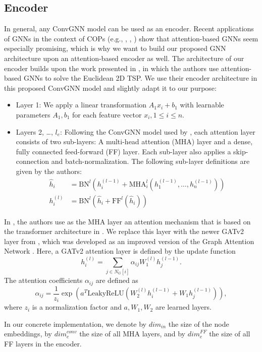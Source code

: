\documentclass[draft,final]{vutinfth} %
\begin{document}
\subsection{Encoder}
In general, any ConvGNN model can be used as an encoder. Recent applications of GNNs in the context of COPs (e.g., \cite{Kool2019}, \cite{Joshi2021}, \cite{Hudson2021}) show that attention-based GNNs seem especially promising, which is why we want to build our proposed GNN architecture upon an attention-based encoder as well. 
The architecture of our encoder builds upon the work presented in \cite{Kool2019}, in which the authors use attention-based GNNs to solve the Euclidean 2D TSP. We use their encoder architecture in this proposed ConvGNN model and slightly adapt it to our purpose:
\begin{itemize}
    \item Layer 1: We apply a linear transformation $A_1 x_i + b_1$ with learnable parameters $A_1, b_1$ for each feature vector $x_i, 1 \leq i \leq n$.
    \item Layers 2, \dots, $l_e$: Following the ConvGNN model used by \cite{Kool2019}, each attention layer consists of two sub-layers: A multi-head attention (MHA) layer and a dense, fully connected feed-forward (FF) layer. Each sub-layer also applies a skip-connection and batch-normalization. The following sub-layer definitions are given by the authors: 
    \begin{align*}
        \hat{h}_i &= \text{BN}^l(h_i^{(l-1)} + \mathrm{MHA}_i^l (h_1^{(l-1)}, \dots , h_n^{(l-1)}) ) \\
        h_i^{(l)} &= \text{BN}^l(\hat{h}_i + \mathrm{FF}^l(\hat{h}_i))
    \end{align*}
\end{itemize}
In \cite{Kool2019}, the authors use as the MHA layer an attention mechanism that is based on the transformer architecture in \cite{VaswaniSPUJGKP17}. We replace this layer with the newer GATv2 layer from \cite{Brody2021}, which was developed as an improved version of the Graph Attention Network \cite{Velickovic2018}. Here, a GATv2 attention layer is defined by the update function  
\[
    h_i^{(l)} = \sum_{j \in N_G[i]} \alpha_{ij} W_{1}^{(l)} h_j^{(l-1)}.    
\]
The attention coefficients $\alpha_{ij}$ are defined as 
\[
    \alpha_{ij} = \frac{1}{z_i} \exp(a^T \mathrm{LeakyReLU}(W_2^{(l)}h_i^{(l-1)} + W_1 h_j^{(l-1)} )),    
\]
where $z_i$ is a normalization factor and $a, W_1, W_2$ are learned layers. 

In our concrete implementation, we denote by $\mathit{dim}_{\mathit{in}}$ the size of the node embeddings, by $\mathit{dim}_e^{\mathit{conv}}$ the size of all MHA layers, and by $\mathit{dim}_e^{\mathit{FF}}$ the size of all FF layers in the encoder. 
\end{document}
